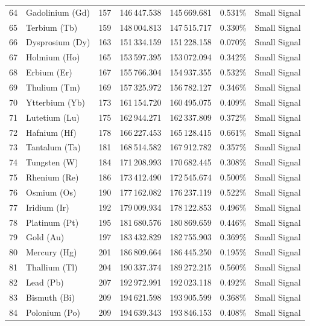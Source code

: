 \begin{footnotesize}
\begin{longtable}{r l r r r r p{3.5cm}}
64 & Gadolinium (Gd)   & 157 & 146\,447.538 & 145\,669.681 & 0.531\% & Small Signal \\
65 & Terbium (Tb)      & 159 & 148\,004.813 & 147\,515.717 & 0.330\% & Small Signal \\
66 & Dysprosium (Dy)   & 163 & 151\,334.159 & 151\,228.158 & 0.070\% & Small Signal \\
67 & Holmium (Ho)      & 165 & 153\,597.395 & 153\,072.094 & 0.342\% & Small Signal \\
68 & Erbium (Er)       & 167 & 155\,766.304 & 154\,937.355 & 0.532\% & Small Signal \\
69 & Thulium (Tm)      & 169 & 157\,325.972 & 156\,782.127 & 0.346\% & Small Signal \\
70 & Ytterbium (Yb)    & 173 & 161\,154.720 & 160\,495.075 & 0.409\% & Small Signal \\
71 & Lutetium (Lu)     & 175 & 162\,944.271 & 162\,337.809 & 0.372\% & Small Signal \\
72 & Hafnium (Hf)      & 178 & 166\,227.453 & 165\,128.415 & 0.661\% & Small Signal \\
73 & Tantalum (Ta)     & 181 & 168\,514.582 & 167\,912.782 & 0.357\% & Small Signal \\
74 & Tungsten (W)      & 184 & 171\,208.993 & 170\,682.445 & 0.308\% & Small Signal \\
75 & Rhenium (Re)      & 186 & 173\,412.490 & 172\,545.674 & 0.500\% & Small Signal \\
76 & Osmium (Os)       & 190 & 177\,162.082 & 176\,237.119 & 0.522\% & Small Signal \\
77 & Iridium (Ir)      & 192 & 179\,009.934 & 178\,122.853 & 0.496\% & Small Signal \\
78 & Platinum (Pt)     & 195 & 181\,680.576 & 180\,869.659 & 0.446\% & Small Signal \\
79 & Gold (Au)         & 197 & 183\,432.829 & 182\,755.903 & 0.369\% & Small Signal \\
80 & Mercury (Hg)      & 201 & 186\,809.664 & 186\,445.250 & 0.195\% & Small Signal \\
81 & Thallium (Tl)     & 204 & 190\,337.374 & 189\,272.215 & 0.560\% & Small Signal \\
82 & Lead (Pb)         & 207 & 192\,972.991 & 192\,023.118 & 0.492\% & Small Signal \\
83 & Bismuth (Bi)      & 209 & 194\,621.598 & 193\,905.599 & 0.368\% & Small Signal \\
84 & Polonium (Po)     & 209 & 194\,639.343 & 193\,846.153 & 0.408\% & Small Signal \\

\end{longtable}
\end{footnotesize}
